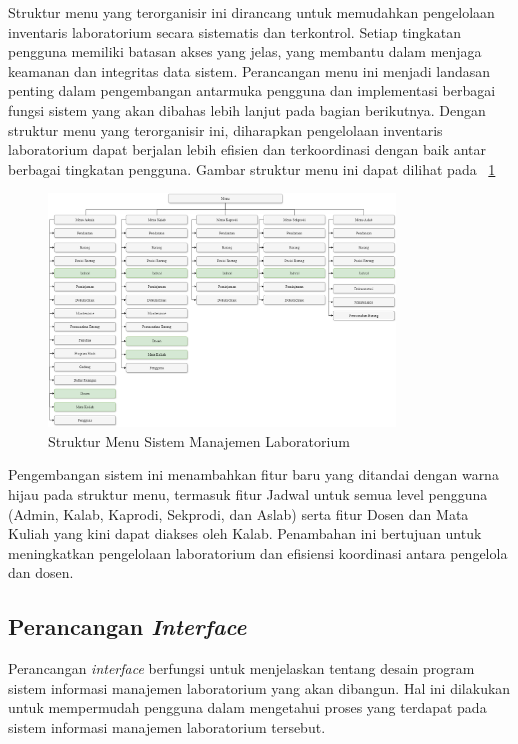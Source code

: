 Struktur menu yang terorganisir ini dirancang untuk memudahkan pengelolaan inventaris laboratorium secara sistematis dan terkontrol. Setiap tingkatan pengguna memiliki batasan akses yang jelas, yang membantu dalam menjaga keamanan dan integritas data sistem. Perancangan menu ini menjadi landasan penting dalam pengembangan antarmuka pengguna dan implementasi berbagai fungsi sistem yang akan dibahas lebih lanjut pada bagian berikutnya. Dengan struktur menu yang terorganisir ini, diharapkan pengelolaan inventaris laboratorium dapat berjalan lebih efisien dan terkoordinasi dengan baik antar berbagai tingkatan pengguna. Gambar struktur menu ini dapat dilihat pada \pic~\ref{StrukturMenuILMIS}

\begin{figure}
	\centering
	\includegraphics[width=0.82\textwidth]{konten/gambar/menu.png}
	\caption{Struktur Menu Sistem Manajemen Laboratorium}
	\label{StrukturMenuILMIS}
\end{figure}

Pengembangan sistem ini menambahkan fitur baru yang ditandai dengan warna hijau pada struktur menu, termasuk fitur Jadwal untuk semua level pengguna (Admin, Kalab, Kaprodi, Sekprodi, dan Aslab) serta fitur Dosen dan Mata Kuliah yang kini dapat diakses oleh Kalab. Penambahan ini bertujuan untuk meningkatkan pengelolaan laboratorium dan efisiensi koordinasi antara pengelola dan dosen.

\subsection{Perancangan \textit{Interface}}
Perancangan \textit{interface} berfungsi untuk menjelaskan tentang desain program sistem informasi manajemen laboratorium yang akan dibangun. Hal ini dilakukan untuk mempermudah pengguna dalam mengetahui proses yang terdapat pada sistem informasi manajemen laboratorium tersebut.

